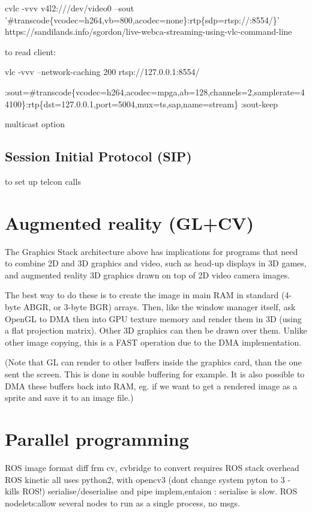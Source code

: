 \documentclass[oneside,english]{scrbook}
\begin{document}
cvlc -vvv v4l2:///dev/video0 --sout '\#transcode\{vcodec=h264,vb=800,acodec=none\}:rtp\{sdp=rtsp://:8554/\}'
https://sandilands.info/sgordon/live-webca-streaming-using-vlc-command-line

to read client: 

vlc -vvv --network-caching 200 rtsp://127.0.0.1:8554/

:sout=\#transcode\{vcodec=h264,acodec=mpga,ab=128,channels=2,samplerate=44100\}:rtp\{dst=127.0.0.1,port=5004,mux=ts,sap,name=stream\}
:sout-keep

multicast option


\section{Session Initial Protocol (SIP)}

to set up telcon calls


\chapter{Augmented reality (GL+CV)}

The Graphics Stack architecture above has implications for programs that need to combine 2D and 3D graphics and video, such as head-up displays in 3D games, and augmented reality 3D graphics drawn on top of 2D video camera images.

The best way to do these is to create the image in main RAM in standard (4-byte ABGR, or 3-byte BGR) arrays. Then, like the window manager itself, ask OpenGL to DMA then into GPU texture memory and render them in 3D (using a flat projection matrix). Other 3D graphics can then be drawn over them.  Unlike other image copying, this is a FAST operation due to the DMA implementation.

(Note that GL can render to other buffers inside the graphics card, than the one sent the screen. This is done in souble buffering for example. It is also possible to DMA these buffers back into RAM, eg. if we want to get a rendered image as a sprite and save it to an image file.)

\chapter{Parallel programming}

ROS image format diff frm cv, cvbridge to convert requires ROS stack
overhead ROS kinetic all uses python2, with opencv3 (dont change system
pyton to 3 - kills ROS!) serialise/deserialise and pipe implem,entaion
: serialise is slow. ROS nodelets:allow several nodes to run as a
single process, no msgs.
\end{document}
